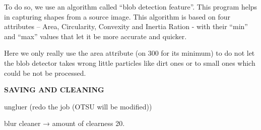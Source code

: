	To do so, we use an algorithm called “blob detection feature”. This program helps in capturing shapes from a source image. This algorithm is based on four attributes – Area, Circularity, Convexity and Inertia Ration - with their “min” and “max” values that let it be more accurate and quicker.
	
	Here we only really use the area attribute (on 300 for its minimum) to do not let the blob detector takes wrong little particles like dirt ones or to small ones which could be not be processed.

\textbf{SAVING AND CLEANING}

ungluer (redo the job (OTSU will be modified))

blur cleaner → amount of clearness 20.